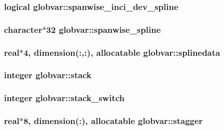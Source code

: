 \subsubsection[{spanwise\+\_\+inci\+\_\+dev\+\_\+spline}]{\setlength{\rightskip}{0pt plus 5cm}logical globvar\+::spanwise\+\_\+inci\+\_\+dev\+\_\+spline}\label{namespaceglobvar_a5669ea00f010c1d3530ecb52446dd4fb}
\hypertarget{namespaceglobvar_a6a1dfe25b49d1fa165e1f63466b92629}{}
\subsubsection[{spanwise\+\_\+spline}]{\setlength{\rightskip}{0pt plus 5cm}character$\ast$32 globvar\+::spanwise\+\_\+spline}\label{namespaceglobvar_a6a1dfe25b49d1fa165e1f63466b92629}
\hypertarget{namespaceglobvar_ae19ac4fbce29d3ec8bdd4a274023361f}{}
\subsubsection[{splinedata}]{\setlength{\rightskip}{0pt plus 5cm}real$\ast$4, dimension(\+:,\+:), allocatable globvar\+::splinedata}\label{namespaceglobvar_ae19ac4fbce29d3ec8bdd4a274023361f}
\hypertarget{namespaceglobvar_af2a9883201aae595b762ba7ca329a73e}{}
\subsubsection[{stack}]{\setlength{\rightskip}{0pt plus 5cm}integer globvar\+::stack}\label{namespaceglobvar_af2a9883201aae595b762ba7ca329a73e}
\hypertarget{namespaceglobvar_a795725a0e45ccc9a453ce62e4311aa86}{}
\subsubsection[{stack\+\_\+switch}]{\setlength{\rightskip}{0pt plus 5cm}integer globvar\+::stack\+\_\+switch}\label{namespaceglobvar_a795725a0e45ccc9a453ce62e4311aa86}
\hypertarget{namespaceglobvar_adf510f84d1bfa9c2e369c105376b1009}{}
\subsubsection[{stagger}]{\setlength{\rightskip}{0pt plus 5cm}real$\ast$8, dimension(\+:), allocatable globvar\+::stagger}\label{namespaceglobvar_adf510f84d1bfa9c2e369c105376b1009}
\hypertarget{namespaceglobvar_abf2b9f230322f087169e3c845b003237}{}
